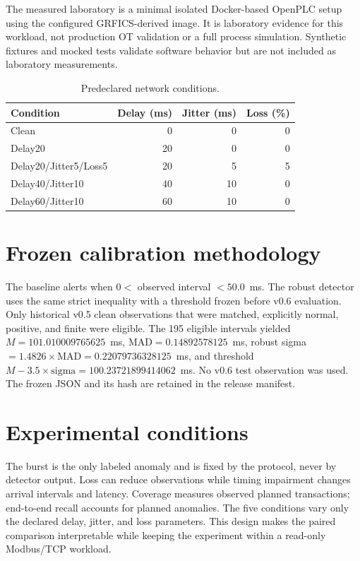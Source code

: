 \documentclass[11pt]{article}
\begin{document}
The measured laboratory is a minimal isolated Docker-based OpenPLC setup using
the configured GRFICS-derived image. It is laboratory evidence for this workload,
not production OT validation or a full process simulation. Synthetic fixtures and
mocked tests validate software behavior but are not included as laboratory
measurements.

\begin{table}[t]
\centering
\caption{Predeclared network conditions.}
\label{tab:conditions}
\begin{tabular}{lrrr}
\toprule
Condition & Delay (ms) & Jitter (ms) & Loss (\%)\\
\midrule
Clean & 0 & 0 & 0\\
Delay20 & 20 & 0 & 0\\
Delay20/Jitter5/Loss5 & 20 & 5 & 5\\
Delay40/Jitter10 & 40 & 10 & 0\\
Delay60/Jitter10 & 60 & 10 & 0\\
\bottomrule
\end{tabular}
\end{table}

\section{Frozen calibration methodology}
The baseline alerts when $0 <$ observed interval $<50.0$~ms. The robust detector
uses the same strict inequality with a threshold frozen before v0.6 evaluation.
Only historical v0.5 clean observations that were matched, explicitly normal,
positive, and finite were eligible. The 195 eligible intervals yielded
$M=101.010009765625$~ms, $\mathrm{MAD}=0.14892578125$~ms, robust sigma
$=1.4826\times\mathrm{MAD}=0.22079736328125$~ms, and threshold
$M-3.5\times\mathrm{sigma}=100.23721899414062$~ms. No v0.6 test observation
was used. The frozen JSON and its hash are retained in the release manifest.

\section{Experimental conditions}
The burst is the only labeled anomaly and is fixed by the protocol, never by
detector output. Loss can reduce observations while timing impairment changes
arrival intervals and latency. Coverage measures observed planned transactions;
end-to-end recall accounts for planned anomalies. The five conditions vary only
the declared delay, jitter, and loss parameters. This design makes the paired
comparison interpretable while keeping the experiment within a read-only
Modbus/TCP workload.
\end{document}
